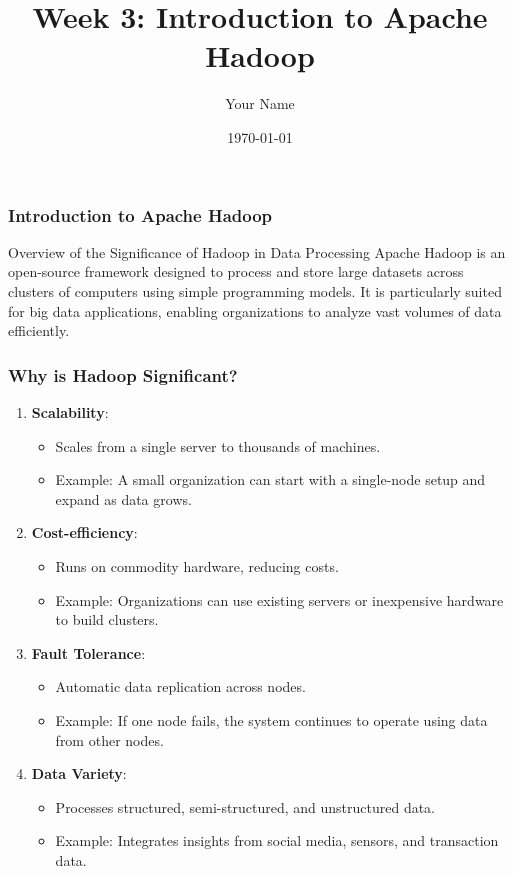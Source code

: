 \documentclass{beamer}
\title{Week 3: Introduction to Apache Hadoop}
\author{Your Name}
\institute{Your Institution}
\date{\today}
\begin{document}
\frame{\titlepage}

\begin{frame}[fragile]
    \frametitle{Introduction to Apache Hadoop}
    \begin{block}{Overview of the Significance of Hadoop in Data Processing}
        Apache Hadoop is an open-source framework designed to process and store large datasets across clusters of computers using simple programming models. 
        It is particularly suited for big data applications, enabling organizations to analyze vast volumes of data efficiently.
    \end{block}
\end{frame}

\begin{frame}[fragile]
    \frametitle{Why is Hadoop Significant?}
    \begin{enumerate}
        \item \textbf{Scalability}:
        \begin{itemize}
            \item Scales from a single server to thousands of machines.
            \item Example: A small organization can start with a single-node setup and expand as data grows.
        \end{itemize}

        \item \textbf{Cost-efficiency}:
        \begin{itemize}
            \item Runs on commodity hardware, reducing costs.
            \item Example: Organizations can use existing servers or inexpensive hardware to build clusters.
        \end{itemize}

        \item \textbf{Fault Tolerance}:
        \begin{itemize}
            \item Automatic data replication across nodes.
            \item Example: If one node fails, the system continues to operate using data from other nodes.
        \end{itemize}

        \item \textbf{Data Variety}:
        \begin{itemize}
            \item Processes structured, semi-structured, and unstructured data.
            \item Example: Integrates insights from social media, sensors, and transaction data.
        \end{itemize}
    \end{enumerate}
\end{frame}
\end{document}
